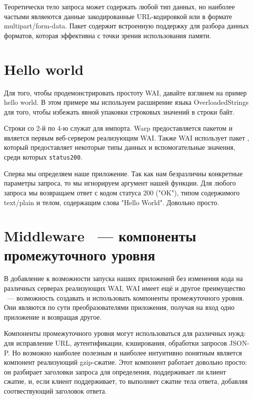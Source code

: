 Теоретически тело запроса может содержать любой тип данных, но наиболее частыми являеются данные
закодированные URL-кодировкой или в формате multipart/form-data. Пакет
 содержит встроенную
поддержку для разбора данных форматов, которая эффективна с точки зрения использования памяти.

\section{Hello world}

Для того, чтобы продемонстрировать простоту WAI, давайте взглянем на пример hello world.
В этом примере мы используем расширение языка OverloadedStrings для того, чтобы избежать
явной упаковки строковых значений в строки байт.



Строки со 2-й по 4-ю служат для импорта. Warp предоставляется пакетом
 и является первым веб-сервером реализующим WAI. Также WAI использует пакет
, который
предоставляет некоторые типы данных и вспомогательные значения,
среди которых \lstinline!status200!.

Сперва мы определяем наше приложение. Так как нам безразличны конкретные параметры
запроса, то мы игнорируем аргумент нашей функции. Для любого запроса мы возвращаем
ответ с кодом статуса 200 ("OK"), типом содержимого text/plain и телом, содержащим
слова "Hello World". Довольно просто.

\section {Middleware ~--- компоненты промежуточного уровня}

В добавление к возможности запуска наших приложений без изменения
кода на различных серверах реализующих WAI, WAI имеет ещё и другое преимущество ~--- возможность создавать и использовать компоненты промежуточного уровня. Они являются по сути
преобразователями приложения, получая на вход одно приложение и возвращая другое.

Компоненты промежуточного уровня могут использоваться для различных нужд: для исправление URL,
аутентификации, кэширования, обработки запросов JSON-P. Но возможно наиболее полезным
и наиболее интуитивно понятным является компонент реализующий gzip-сжатие. Этот компонент работает
довольно просто: он разбирает заголовки запроса для определения, поддерживает ли клиент
сжатие, и, если клиент поддерживает, то выполняет сжатие тела ответа, добавляя соотвествующий
заголовок ответа.

